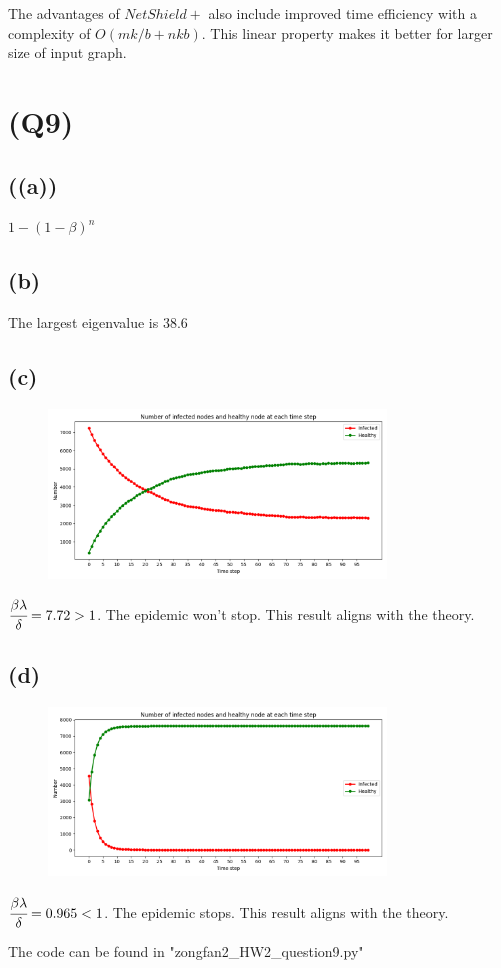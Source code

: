 \documentclass[]{article}
\begin{document}
The advantages of $NetShield+$ also include improved time efficiency with a complexity of $O(mk/b+nkb)$. This linear property makes it better for larger size of input graph. 

\newpage

\section*{(Q9)}

\subsection*{((a))}
$1-(1-\beta)^n$

\subsection*{(b)}
The largest eigenvalue is 38.6

\subsection*{(c)}
\begin{figure}[!ht]
    \centering
    \includegraphics[width=0.8\textwidth]{fig/hw2_q9_c.png}
\end{figure}

$\cfrac{\beta\lambda}{\delta} = 7.72>1$. The epidemic won't stop. This result aligns with the theory. 

\subsection*{(d)}
\begin{figure}[!ht]
    \centering
    \includegraphics[width=0.8\textwidth]{fig/hw2_q9_d.png}
\end{figure}

$\cfrac{\beta\lambda}{\delta} = 0.965<1$. The epidemic stops. This result aligns with the theory. 

The code can be found in "zongfan2\_HW2\_question9.py"
\end{document}

